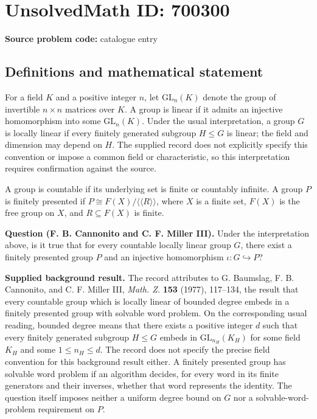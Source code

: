 \documentclass[11pt]{article}
\begin{document}
\section*{UnsolvedMath ID: 700300}
\textbf{Source problem code:} catalogue entry
\subsection{Definitions and mathematical statement}
For a field \(K\) and a positive integer \(n\), let \(\mathrm{GL}_n(K)\) denote the group of invertible \(n\times n\) matrices over \(K\). A group is linear if it admits an injective homomorphism into some \(\mathrm{GL}_n(K)\). Under the usual interpretation, a group \(G\) is locally linear if every finitely generated subgroup \(H\leq G\) is linear; the field and dimension may depend on \(H\). The supplied record does not explicitly specify this convention or impose a common field or characteristic, so this interpretation requires confirmation against the source.

A group is countable if its underlying set is finite or countably infinite. A group \(P\) is finitely presented if \(P\cong F(X)/\langle\!\langle R\rangle\!\rangle\), where \(X\) is a finite set, \(F(X)\) is the free group on \(X\), and \(R\subseteq F(X)\) is finite.

\textbf{Question (F. B. Cannonito and C. F. Miller III).} Under the interpretation above, is it true that for every countable locally linear group \(G\), there exist a finitely presented group \(P\) and an injective homomorphism \(\iota:G\hookrightarrow P\)?

\textbf{Supplied background result.} The record attributes to G. Baumslag, F. B. Cannonito, and C. F. Miller III, \emph{Math. Z.} \textbf{153} (1977), 117--134, the result that every countable group which is locally linear of bounded degree embeds in a finitely presented group with solvable word problem. On the corresponding usual reading, bounded degree means that there exists a positive integer \(d\) such that every finitely generated subgroup \(H\leq G\) embeds in \(\mathrm{GL}_{n_H}(K_H)\) for some field \(K_H\) and some \(1\leq n_H\leq d\). The record does not specify the precise field convention for this background result either. A finitely presented group has solvable word problem if an algorithm decides, for every word in its finite generators and their inverses, whether that word represents the identity. The question itself imposes neither a uniform degree bound on \(G\) nor a solvable-word-problem requirement on \(P\).
\end{document}
